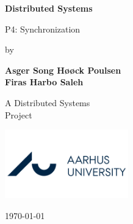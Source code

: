 \newcommand{\norm}[1]{\left\lVert#1\right\rVert}     
\newcommand\course{Distributed Systems}        %
\newcommand\hwnumber{4}                                   %
\newcommand\Information{XXX/xxxxxxxx}                     %
\begin{titlepage}
    \begin{center}
        \vspace*{3cm}
            
        \Huge
        \textbf{\course{}}
            
        \vspace{1cm}
        \huge
        P\hwnumber : Synchronization
            
        \vspace{1.5cm}
        \Large
        by
        
        \textbf{Asger Song Høøck Poulsen} \\%
        \textbf{Firas Harbo Saleh} %
        
            
        \vfill
        
        A \course{} \\Project
            
        \vspace{0.5cm}
            
        \includegraphics[width=0.4\textwidth]{img/aarhus-university.png}
        \\
        
        \Large
        
        \today
            
    \end{center}
\end{titlepage}